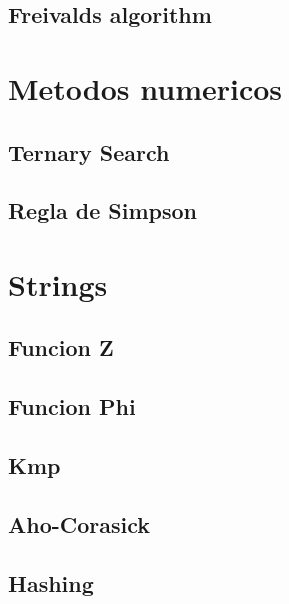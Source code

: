 \subsection{Freivalds algorithm}
\raggedbottom
\hrulefill

\section{Metodos numericos}
\subsection{Ternary Search}
\raggedbottom
\hrulefill
\subsection{Regla de Simpson}
\raggedbottom
\hrulefill

\section{Strings}
\subsection{Funcion Z}
\raggedbottom
\hrulefill
\subsection{Funcion Phi}
\raggedbottom
\hrulefill
\subsection{Kmp}
\raggedbottom
\hrulefill
\subsection{Aho-Corasick}
\raggedbottom
\hrulefill
\subsection{Hashing}
\raggedbottom
\hrulefill
